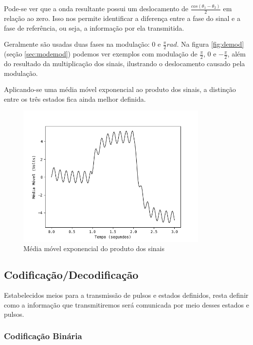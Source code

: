 \documentclass[titlepage,twocolumn]{article}
\begin{document}
Pode-se ver que a onda resultante possui um deslocamento de $\frac{cos(\theta_1-\theta_2)}{2}$ em relação ao zero. Isso nos permite identificar a diferença entre a fase do sinal e a fase de referência, ou seja, a informação por ela transmitida.

Geralmente são usadas duas fases na modulação: 0 e $\frac{\pi}{2}rad$. Na figura \ref{fig:demod} (seção \ref{sec:modemod}) podemos ver exemplos com modulação de $\frac{\pi}{2}$, 0 e $-\frac{\pi}{2}$, além do resultado da multiplicação dos sinais, ilustrando o deslocamento causado pela modulação.

Aplicando-se uma média móvel exponencial ao produto dos sinais, a distinção entre os três estados fica ainda melhor definida.

\begin{figure}[H]
    \begin{center}
        \includegraphics[width=9.5cm]{imgs/mediamovel_modulacao_fase.png}
        \caption{Média móvel exponencial do produto dos sinais}
        \label{fig:medmov}
    \end{center}
\end{figure}

\subsection{Codificação/Decodificação}

Estabelecidos meios para a transmissão de pulsos e estados definidos, resta definir como a informação que transmitiremos será comunicada por meio desses estados e pulsos.

\subsubsection{Codificação Binária}
\label{sec:binaria}
\end{document}
